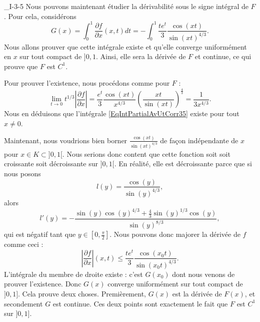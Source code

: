 \begin{corrige}{_I-3-5}
	Nous pouvons maintenant étudier la dérivabilité sous le signe intégral de $F$. Pour cela, considérons
	\begin{equation}		\label{EqIntPartialAvUtCorr35}
		G(x)=\int_0^1\frac{ \partial f }{ \partial x }(x,t)dt=-\int_0^1\frac{ t e^{t} }{ 3 }\frac{ \cos(xt) }{ \sin(xt)^{4/3} }.
	\end{equation}
	Nous allons prouver que cette intégrale existe et qu'elle converge uniformément en $x$ sur tout compact de $]0,1$. Ainsi, elle sera la dérivée de $F$ et continue, ce qui prouve que $F$ est $C^1$.

	Pour prouver l'existence, nous procédons comme pour $F$ :
	\begin{equation}
		\lim_{t\to 0}t^{1/3}\left| \frac{ \partial f }{ \partial x } \right| =\frac{ e^t }{ 3 }\frac{ \cos(xt) }{ x^{4/3} }\left( \frac{ xt }{ \sin(xt) } \right)^{\frac{ 4 }{ 3 }}=\frac{ 1 }{ 3x^{4/3} }.
	\end{equation}
	Nous en déduisons que l'intégrale \eqref{EqIntPartialAvUtCorr35} existe pour tout $x\neq 0$.

	Maintenant, nous voudrions bien borner $\frac{ \cos(xt) }{ \sin(xt)^{4/3} }$ de façon indépendante de $x$ pour $x\in K\subset ]0,1[$. Nous serions donc content que cette fonction soit soit croissante soit décroissante sur $]0,1[$. En réalité, elle est décroissante parce que si nous posons
	\begin{equation}
		l(y)=\frac{ \cos(y) }{ \sin(y)^{4/3} },
	\end{equation}
	alors
	\begin{equation}
		l'(y)=-\frac{ \sin(y)\cos(y)^{4/3}+\frac{ 4 }{ 3 }\sin(y)^{1/3}\cos(y) }{ \sin(y)^{8/3} },
	\end{equation}
	qui est négatif tant que $y\in[0,\frac{ \pi }{ 2 }]$. Nous pouvons donc majorer la dérivée de $f$ comme ceci :
	\begin{equation}
		\left| \frac{ \partial f }{ \partial x } \right| (x,t)\leq\frac{ te^t }{ 3 }\frac{ \cos(x_0t) }{ \sin(x_0t)^{4/3} }.
	\end{equation}
	L'intégrale du membre de droite existe : c'est $G(x_0)$ dont nous venons de prouver l'existence. Donc $G(x)$ converge uniformément sur tout compact de $]0,1]$. Cela prouve deux choses. Premièrement, $G(x)$ est la dérivée de $F(x)$, et secondement $G$ est continue. Ces deux points sont exactement le fait que $F$ est $C^1$ sur $]0,1]$.

\end{corrige}
